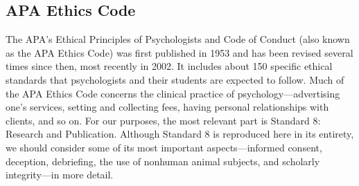 \subsection{APA Ethics Code}


The APA's Ethical Principles of Psychologists and Code of Conduct (also known as the APA Ethics Code) was first published in 1953 and has been revised several times since then, most recently in 2002. It includes about 150 specific ethical standards that psychologists and their students are expected to follow. Much of the APA Ethics Code concerns the clinical practice of psychology---advertising one's services, setting and collecting fees, having personal relationships with clients, and so on. For our purposes, the most relevant part is Standard 8: Research and Publication. Although Standard 8 is reproduced here in its entirety, we should consider some of its most important aspects---informed consent, deception, debriefing, the use of nonhuman animal subjects, and scholarly integrity---in more detail.


\newpage

